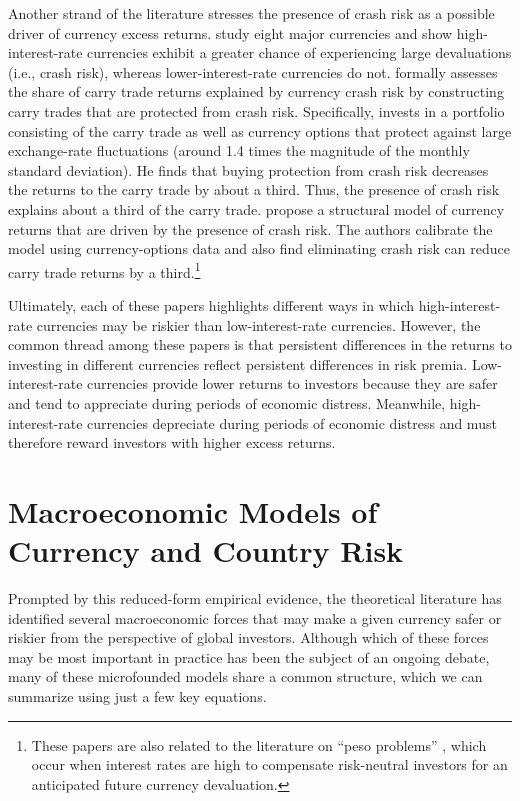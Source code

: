 \documentclass{ar-1col}
\begin{document}
Another strand of the literature stresses the presence of crash risk as a possible driver of currency excess returns. \citet{Brunnermeieretal2009} study eight major currencies and show high-interest-rate currencies exhibit a greater chance of experiencing large devaluations (i.e., crash risk), whereas lower-interest-rate currencies do not. \citet{Jurek2014} formally assesses the share of carry trade returns explained by currency crash risk by constructing carry trades that are protected from crash risk. Specifically, \citet{Jurek2014} invests in a portfolio consisting of the carry trade as well as currency options that protect against large exchange-rate fluctuations (around 1.4 times the magnitude of the monthly standard deviation). He finds that buying protection from crash risk decreases the returns to the carry trade by about a third. Thus, the presence of crash risk explains about a third of the carry trade. \citet{Farhietal2015} propose a structural model of currency returns that are driven by the presence of crash risk. The authors calibrate the model using currency-options data and also find eliminating crash risk can reduce carry trade returns by a third.\footnote{These papers are also related to the literature on ``peso problems'' \citep{Lewis2011}, which occur when interest rates are high to compensate risk-neutral investors for an anticipated future currency devaluation.}

Ultimately, each of these papers highlights different ways in which high-interest-rate currencies may be riskier than low-interest-rate currencies. However, the common thread among these papers is that persistent differences in the returns to investing in different currencies reflect persistent differences in risk premia. Low-interest-rate currencies provide lower returns to investors because they are safer and tend to appreciate during periods of economic distress. Meanwhile, high-interest-rate currencies depreciate during periods of economic distress and must therefore reward investors with higher excess returns.



\section{Macroeconomic Models of Currency and Country Risk\label{sec_theory}}

Prompted by this reduced-form empirical evidence, the theoretical literature has identified several macroeconomic forces that may make a given currency safer or riskier from the perspective of global investors. Although which of these forces may be most important in practice has been the subject of an ongoing debate, many of these microfounded models share a common structure, which we can summarize using just a few key equations.
\end{document}
